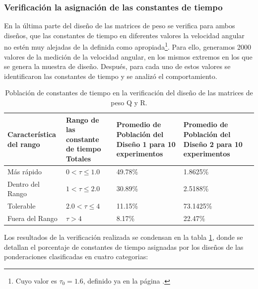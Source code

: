 \documentclass[10pt]{report}
\numberwithin{equation}{chapter}
\numberwithin{algorithm}{chapter}
\begin{document}
\subsubsection{Verificación la asignación de las constantes de tiempo}
En la última parte del diseño de las matrices de peso se verifica para ambos diseños, que las constantes de tiempo en diferentes valores la velocidad angular no estén muy alejadas de la definida como apropiada\footnote{Cuyo valor es $\tau_0=1.6$, definido ya en la página \pageref{tau0}.}. Para ello, generamos 2000 valores de la medición de la velocidad angular, en los mismos extremos en los que se genera la muestra de diseño. Después, para cada uno de estos valores se identificaron las constantes de tiempo y se analizó el comportamiento. \par
\begin{table}[t]
\begin{center}
\begin{scriptsize}
\begin{tabular}{p{2.5cm}|p{2.5cm}|p{2.5cm}|p{2.5cm}c} \hline
\center\textbf{Característica del rango}& \center\textbf{Rango de las constante de tiempo Totales}&\center\textbf{Promedio de Población del Diseño 1 para 10 experimentos}&\center\textbf{Promedio de Población del Diseño 2 para 10 experimentos}&\\ \hline
Más rápido&$0<\tau\leq1.0$&49.78\%&1.8625\%\\
Dentro del Rango&$1<\tau\leq2.0$&30.89\%&2.5188\%\\
Tolerable &$2.0<\tau\leq4$&11.15\%&73.1425\%\\
Fuera del Rango&$\tau>4$&8.17\%&22.47\%\\\hline
\end{tabular}
\end{scriptsize}
\caption{Población de constantes de tiempo en la verificación del diseño de las matrices de peso Q y R.} 
\label{ooekf_tb2}
\end{center}
\end{table} 
Los resultados de la verificación realizada se condensan en la tabla \ref{ooekf_tb2}, donde se detallan el porcentaje de constantes de tiempo asignadas por los diseños de las ponderaciones clasificadas en cuatro categorias: 
\end{document}
